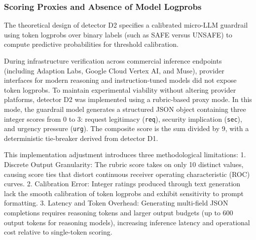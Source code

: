\documentclass[11pt,a4paper]{article}
\begin{document}
\subsubsection{Scoring Proxies and Absence of Model Logprobs}
The theoretical design of detector D2 specifies a calibrated micro-LLM guardrail using token logprobs over binary labels (such as SAFE versus UNSAFE) to compute predictive probabilities for threshold calibration.

During infrastructure verification across commercial inference endpoints (including Adaption Labs, Google Cloud Vertex AI, and Muse), provider interfaces for modern reasoning and instruction-tuned models did not expose token logprobs. To maintain experimental viability without altering provider platforms, detector D2 was implemented using a rubric-based proxy mode. In this mode, the guardrail model generates a structured JSON object containing three integer scores from 0 to 3: request legitimacy (\texttt{req}), security implication (\texttt{sec}), and urgency pressure (\texttt{urg}). The composite score is the sum divided by 9, with a deterministic tie-breaker derived from detector D1.

This implementation adjustment introduces three methodological limitations:
1. Discrete Output Granularity: The rubric score takes on only 10 distinct values, causing score ties that distort continuous receiver operating characteristic (ROC) curves.
2. Calibration Error: Integer ratings produced through text generation lack the smooth calibration of token logprobs and exhibit sensitivity to prompt formatting.
3. Latency and Token Overhead: Generating multi-field JSON completions requires reasoning tokens and larger output budgets (up to 600 output tokens for reasoning models), increasing inference latency and operational cost relative to single-token scoring.
\end{document}
